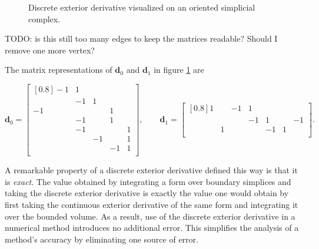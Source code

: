 \documentclass[utf8,english]{gradu3}
\begin{document}
\begin{figure}[h]
  \caption{Discrete exterior derivative visualized on an oriented simplicial complex.}
  \label{fig:discrete_ext_derivative}
\end{figure}

TODO: is this still too many edges to keep the matrices readable?
Should I remove one more vertex?

The matrix representations of $\mathbf{d}_0$ and $\mathbf{d}_1$
in figure \ref{fig:discrete_ext_derivative} are

\[
  \mathbf{d}_0 = \begin{bmatrix}[0.8]
    -1 & 1 \\
       & -1 & 1 \\
    -1 & & & 1 \\
       & -1 & & 1 \\
       & -1 & & & 1 \\
       & & -1 & & 1 \\
       & & & -1 & 1 \\
  \end{bmatrix},
  \qquad
  \mathbf{d}_1 = \begin{bmatrix}[0.8]
    1 & & -1 & 1 \\
      & & & -1 & 1 & & -1 \\
      & 1 & & & -1 & 1 \\
  \end{bmatrix}.
\]

A remarkable property of a discrete exterior derivative
defined this way is that it is \textit{exact}.
The value obtained by integrating a form over boundary simplices
and taking the discrete exterior derivative
is exactly the value one would obtain
by first taking the continuous exterior derivative of the same form
and integrating it over the bounded volume.
As a result, use of the discrete exterior derivative in a numerical method
introduces no additional error.
This simplifies the analysis of a method's accuracy
by eliminating one source of error.
\end{document}
